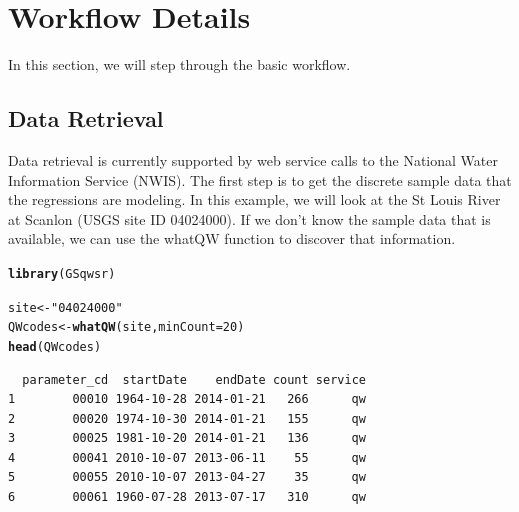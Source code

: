 \documentclass[a4paper,11pt]{article}\usepackage[]{graphicx}\usepackage[]{color}
\makeatletter
\newcommand{\hlnum}[1]{\textcolor[rgb]{0.686,0.059,0.569}{#1}}%
\newcommand{\hlstr}[1]{\textcolor[rgb]{0.192,0.494,0.8}{#1}}%
\newcommand{\hlstd}[1]{\textcolor[rgb]{0.345,0.345,0.345}{#1}}%
\newcommand{\hlkwb}[1]{\textcolor[rgb]{0.69,0.353,0.396}{#1}}%
\newcommand{\hlkwc}[1]{\textcolor[rgb]{0.333,0.667,0.333}{#1}}%
\newcommand{\hlkwd}[1]{\textcolor[rgb]{0.737,0.353,0.396}{\textbf{#1}}}%
\newenvironment{kframe}{%
 \def\at@end@of@kframe{}%
 \ifinner\ifhmode%
  \def\at@end@of@kframe{\end{minipage}}%
  \begin{minipage}{\columnwidth}%
 \fi\fi%
 \def\FrameCommand##1{\hskip\@totalleftmargin \hskip-\fboxsep
 \colorbox{shadecolor}{##1}\hskip-\fboxsep
     \hskip-\linewidth \hskip-\@totalleftmargin \hskip\columnwidth}%
 \MakeFramed {\advance\hsize-\width
   \@totalleftmargin\z@ \linewidth\hsize
   \@setminipage}}%
 {\par\unskip\endMakeFramed%
 \at@end@of@kframe}
\newenvironment{knitrout}{}{} %
\makeatother
\begin{document}
\section{Workflow Details}
\label{sec:details}
In this section, we will step through the basic workflow.

\subsection{Data Retrieval}
Data retrieval is currently supported by web service calls to the National Water Information Service (NWIS). The first step is to get the discrete sample data that the regressions are modeling. In this example, we will look at the St Louis River at Scanlon (USGS site ID 04024000). If we don't know the sample data that is available, we can use the whatQW function to discover that information. 

\begin{knitrout}
\color{fgcolor}\begin{kframe}
\begin{alltt}
\hlkwd{library}\hlstd{(GSqwsr)}
\end{alltt}
\end{kframe}
\end{knitrout}






\begin{knitrout}
\color{fgcolor}\begin{kframe}
\begin{alltt}
\hlstd{site} \hlkwb{<-} \hlstr{"04024000"}
\hlstd{QWcodes} \hlkwb{<-} \hlkwd{whatQW}\hlstd{(site,} \hlkwc{minCount}\hlstd{=}\hlnum{20}\hlstd{)}
\hlkwd{head}\hlstd{(QWcodes)}
\end{alltt}
\begin{verbatim}
  parameter_cd  startDate    endDate count service
1        00010 1964-10-28 2014-01-21   266      qw
2        00020 1974-10-30 2014-01-21   155      qw
3        00025 1981-10-20 2014-01-21   136      qw
4        00041 2010-10-07 2013-06-11    55      qw
5        00055 2010-10-07 2013-04-27    35      qw
6        00061 1960-07-28 2013-07-17   310      qw
\end{verbatim}
\end{kframe}
\end{knitrout}
\end{document}
